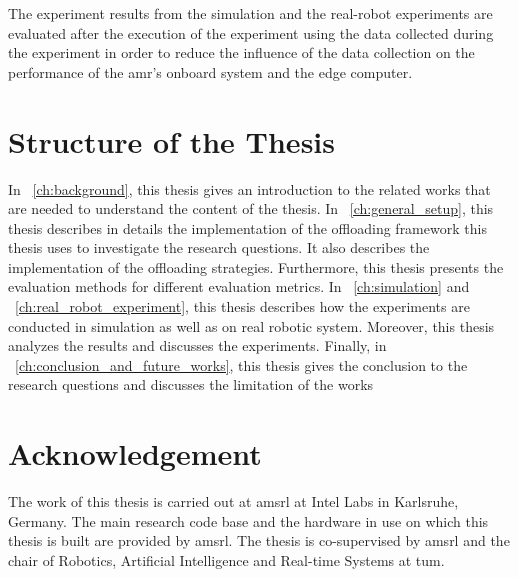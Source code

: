 The experiment results from the simulation and the real-robot experiments are evaluated after the execution of the experiment using the data collected during the experiment in order to reduce the influence of the data collection on the performance of the \gls{amr}'s onboard system and the edge computer.

\section{Structure of the Thesis}

In ~\cref{ch:background}, this thesis gives an introduction to the related works that are needed to understand the content of the thesis. In ~\cref{ch:general_setup}, this thesis describes in details the implementation of the offloading framework this thesis uses to investigate the research questions. It also describes the implementation of the offloading strategies. Furthermore, this thesis presents the evaluation methods for different evaluation metrics. In ~\cref{ch:simulation} and ~\cref{ch:real_robot_experiment}, this thesis describes how the experiments are conducted in simulation as well as on real robotic system. Moreover, this thesis analyzes the results and discusses the experiments. Finally, in ~\cref{ch:conclusion_and_future_works}, this thesis gives the conclusion to the research questions and discusses the limitation of the works 

\section{Acknowledgement}\label{sec:introduction:acknowledgement}

The work of this thesis is carried out at \gls{amsrl} at Intel Labs in Karlsruhe, Germany. The main research code base and the hardware in use on which this thesis is built are provided by \gls{amsrl}. The thesis is co-supervised by \gls{amsrl} and the chair of Robotics, Artificial Intelligence and Real-time Systems at \gls{tum}. 

